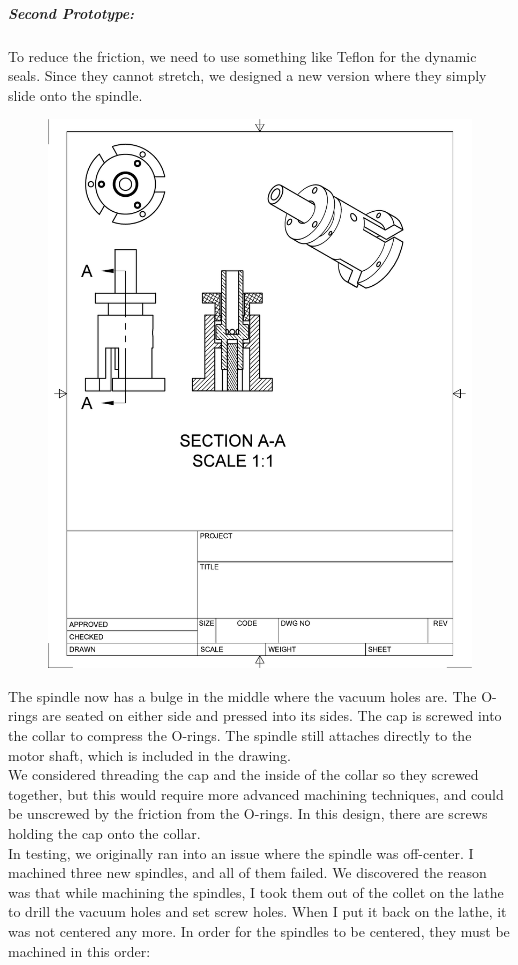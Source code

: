 \documentclass[12pt]{report}
\begin{document}
\subparagraph{Second Prototype:} To reduce the friction, we need to use something like Teflon for the dynamic seals. Since they cannot stretch, we designed a new version where they simply slide onto the spindle.
\begin{figure}[h]
\includegraphics{rev2}
\end{figure}
The spindle now has a bulge in the middle where the vacuum holes are. The O-rings are seated on either side and pressed into its sides. The cap is screwed into the collar to compress the O-rings. The spindle still attaches directly to the motor shaft, which is included in the drawing.  \\
We considered threading the cap and the inside of the collar so they screwed together, but this would require more advanced machining techniques, and could be unscrewed by the friction from the O-rings. In this design, there are screws holding the cap onto the collar. \\
In testing, we originally ran into an issue where the spindle was off-center. I machined three new spindles, and all of them failed. We discovered the reason was that while machining the spindles, I took them out of the collet on the lathe to drill the vacuum holes and set screw holes. When I put it back on the lathe, it was not centered any more. In order for the spindles to be centered, they must be machined in this order:
\end{document}
